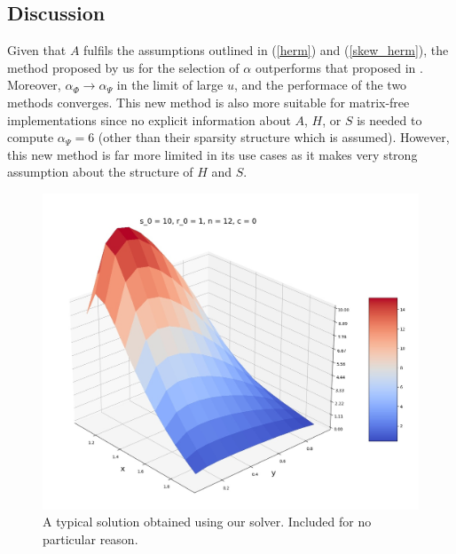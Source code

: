 \documentclass{article}
\begin{document}
\subsection{Discussion}
Given that $A$ fulfils the assumptions outlined in (\ref{herm}) and (\ref{skew_herm}), the method proposed by us for the selection of $\alpha$ outperforms that proposed in \cite{HUANG2014142}. Moreover, $\alpha_{\Phi} \rightarrow \alpha_{\Psi}$ in the limit of large $u$, and the performace of the two methods converges. This new method is also more suitable for matrix-free implementations since no explicit information about $A$, $H$, or $S$ is needed to compute $\alpha_{\Psi} =6$ (other than their sparsity structure which is assumed). However, this new method is far more limited in its use cases as it makes very strong assumption about the structure of $H$ and $S$.



\printbibliography



\begin{figure}[h]
    \centering
    \includegraphics[scale = 0.3]{./graphics/typical_solution.jpeg}
    \caption{A typical solution obtained using our solver. Included for no particular reason.}
    \label{typical_graph}
\end{figure}
\end{document}

